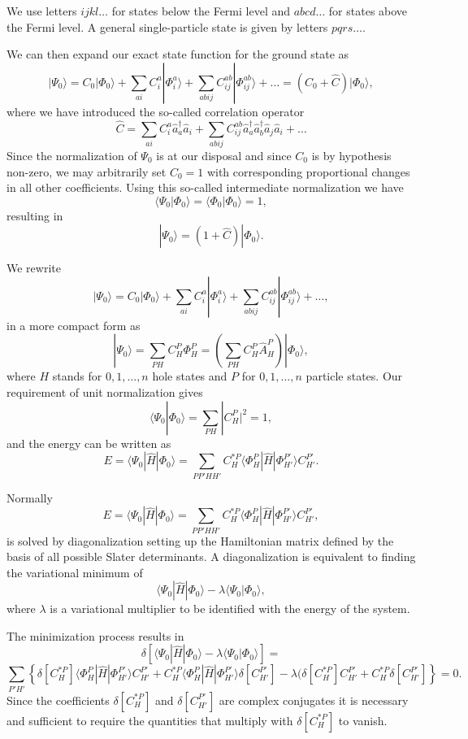 \documentclass[%
twoside,                 %
final,                   %
10pt]{article}
\begin{document}
We use letters $ijkl\dots$ for states below the Fermi level and $abcd\dots$ for states above the Fermi level. A general single-particle state is given by letters $pqrs\dots$.

We can then expand our exact state function for the ground state 
as
\[
|\Psi_0\rangle=C_0|\Phi_0\rangle+\sum_{ai}C_i^a|\Phi_i^a\rangle+\sum_{abij}C_{ij}^{ab}|\Phi_{ij}^{ab}\rangle+\dots
=(C_0+\hat{C})|\Phi_0\rangle,
\]
where we have introduced the so-called correlation operator 
\[
\hat{C}=\sum_{ai}C_i^a\hat{a}_{a}^{\dagger}\hat{a}_i  +\sum_{abij}C_{ij}^{ab}\hat{a}_{a}^{\dagger}\hat{a}_{b}^{\dagger}\hat{a}_j\hat{a}_i+\dots
\]
Since the normalization of $\Psi_0$ is at our disposal and since $C_0$ is by hypothesis non-zero, we may arbitrarily set $C_0=1$ with 
corresponding proportional changes in all other coefficients. Using this so-called intermediate normalization we have
\[
\langle \Psi_0 | \Phi_0 \rangle = \langle \Phi_0 | \Phi_0 \rangle = 1, 
\]
resulting in 
\[
|\Psi_0\rangle=(1+\hat{C})|\Phi_0\rangle.
\]


We rewrite 
\[
|\Psi_0\rangle=C_0|\Phi_0\rangle+\sum_{ai}C_i^a|\Phi_i^a\rangle+\sum_{abij}C_{ij}^{ab}|\Phi_{ij}^{ab}\rangle+\dots,
\]
in a more compact form as 
\[
|\Psi_0\rangle=\sum_{PH}C_H^P\Phi_H^P=\left(\sum_{PH}C_H^P\hat{A}_H^P\right)|\Phi_0\rangle,
\]
where $H$ stands for $0,1,\dots,n$ hole states and $P$ for $0,1,\dots,n$ particle states. 
Our requirement of unit normalization gives
\[
\langle \Psi_0 | \Phi_0 \rangle = \sum_{PH}|C_H^P|^2= 1,
\]
and the energy can be written as 
\[
E= \langle \Psi_0 | \hat{H} |\Phi_0 \rangle= \sum_{PP'HH'}C_H^{*P}\langle \Phi_H^P | \hat{H} |\Phi_{H'}^{P'} \rangle C_{H'}^{P'}.
\]


Normally 
\[
E= \langle \Psi_0 | \hat{H} |\Phi_0 \rangle= \sum_{PP'HH'}C_H^{*P}\langle \Phi_H^P | \hat{H} |\Phi_{H'}^{P'} \rangle C_{H'}^{P'},
\]
is solved by diagonalization setting up the Hamiltonian matrix defined by the basis of all possible Slater determinants. A diagonalization
is equivalent to finding the variational minimum   of 
\[
 \langle \Psi_0 | \hat{H} |\Phi_0 \rangle-\lambda \langle \Psi_0 |\Phi_0 \rangle,
\]
where $\lambda$ is a variational multiplier to be identified with the energy of the system.

The minimization process results in 
\[
\delta\left[ \langle \Psi_0 | \hat{H} |\Phi_0 \rangle-\lambda \langle \Psi_0 |\Phi_0 \rangle\right]=
\]
\[
\sum_{P'H'}\left\{\delta[C_H^{*P}]\langle \Phi_H^P | \hat{H} |\Phi_{H'}^{P'} \rangle C_{H'}^{P'}+
C_H^{*P}\langle \Phi_H^P | \hat{H} |\Phi_{H'}^{P'} \rangle \delta[C_{H'}^{P'}]-
\lambda( \delta[C_H^{*P}]C_{H'}^{P'}+C_H^{*P}\delta[C_{H'}^{P'}]\right\} = 0.
\]
Since the coefficients $\delta[C_H^{*P}]$ and $\delta[C_{H'}^{P'}]$ are complex conjugates it is necessary and sufficient to require the quantities that multiply with $\delta[C_H^{*P}]$ to vanish.  
\end{document}
